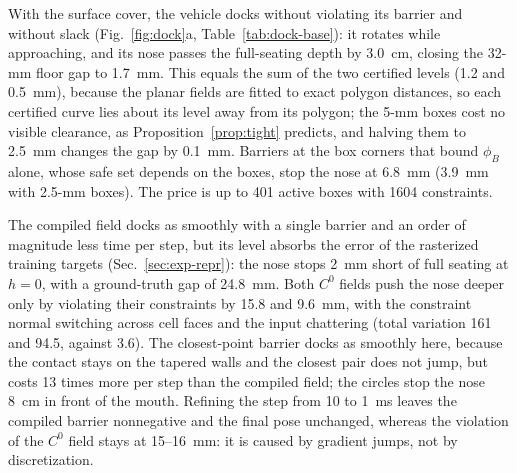 \documentclass[journal]{IEEEtran}
\theoremstyle{definition}
\begin{document}
With the surface cover, the vehicle docks without violating its barrier and without slack
(Fig.~\ref{fig:dock}a, Table~\ref{tab:dock-base}): it rotates while approaching, and its nose passes
the full-seating depth by 3.0~cm, closing the 32-mm floor gap to 1.7~mm. This equals the sum of the
two certified levels (1.2 and 0.5~mm), because the planar fields are fitted to exact polygon distances,
so each certified curve lies about its level away from its polygon; the 5-mm boxes cost no visible clearance, as
Proposition~\ref{prop:tight} predicts, and halving them to 2.5~mm changes the gap by 0.1~mm. Barriers at the box corners that bound $\phi_B$ alone, whose safe set
depends on the boxes, stop the nose at 6.8~mm (3.9~mm with 2.5-mm boxes). The price is up to 401 active boxes with 1604 constraints.

The compiled field docks as smoothly with a single barrier and an order of magnitude less time per step,
but its level absorbs the error of the rasterized training targets (Sec.~\ref{sec:exp-repr}): the nose
stops 2~mm short of full seating at $h=0$, with a ground-truth gap of 24.8~mm. Both $C^0$
fields push the nose deeper only by violating their constraints by 15.8 and 9.6~mm, with the
constraint normal switching across cell faces and the input chattering (total variation 161 and
94.5, against 3.6). The closest-point barrier docks as smoothly here, because the contact stays on
the tapered walls and the closest pair does not jump, but costs 13 times more per step than the
compiled field; the circles stop the nose 8~cm in front of the mouth. Refining the step from 10 to 1~ms leaves the compiled barrier
nonnegative and the final pose unchanged, whereas the violation of the $C^0$ field stays at
15--16~mm: it is caused by gradient jumps, not by discretization.
\end{document}
